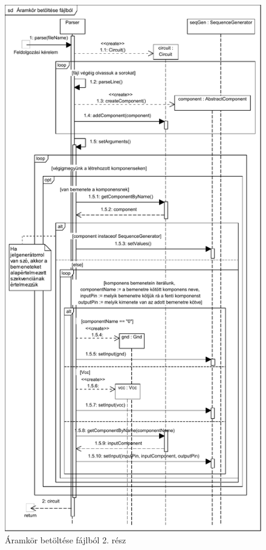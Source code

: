 \begin{figure}[H]
\begin{center}
\includegraphics*[viewport = 0 0 500 581]{chapters/chapter03/seqdiagrams/aramkor_betoltese_fajlbol.pdf}
\caption{Áramkör betöltése fájlból 2. rész}
\label{fig:aramkor_betoltese_fajlbol}
\end{center}
\end{figure}

